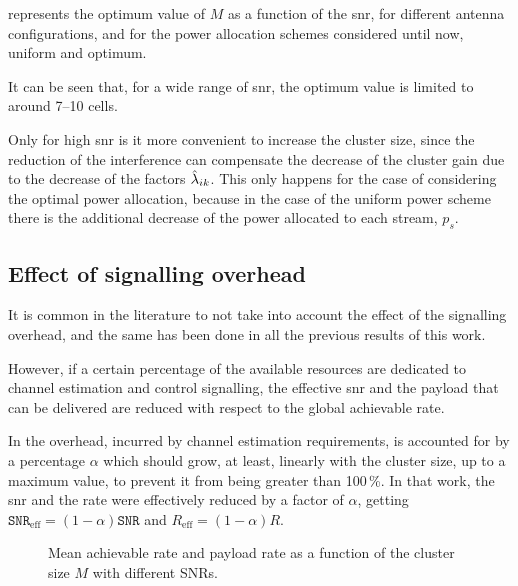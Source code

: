  represents the optimum value of $M$ as a function of the
\gls{snr}, for different antenna configurations, and for the power allocation
schemes considered until now, uniform and optimum.

It can be seen that, for a wide range of \gls{snr}, the optimum value is limited
to around 7--10 cells.

Only for high \gls{snr} is it more convenient to increase the cluster size,
since the reduction of the interference can compensate the decrease of the
cluster gain due to the decrease of the factors $\hat{\lambda}_{ik}$. This only
happens for the case of considering the optimal power allocation, because in the
case of the uniform power scheme there is the additional decrease of the power
allocated to each stream, $p_s$.

\subsection{Effect of signalling overhead}\label{ssec:achiev_signal_overhead}

It is common in the literature to not take into account the effect of the
signalling overhead, and the same has been done in all the previous results of
this work.

However, if a certain percentage of the available resources are dedicated to
channel estimation and control signalling, the effective \gls{snr} and the
payload that can be delivered are reduced with respect to the global achievable
rate.

In \cite{lozano13} the overhead, incurred by channel estimation requirements, is
accounted for by a percentage $\alpha$ which should grow, at least, linearly
with the cluster size, up to a maximum value, to prevent it from being greater
than 100\,\%. In that work, the \gls{snr} and the rate were effectively reduced
by a factor of $\alpha$, getting $\mathtt{SNR}_{\text{eff}}=\left(1-\alpha
\right)\mathtt{SNR}$ and $R_{\text{eff}} = \left(1-\alpha\right)R$.

\begin{figure}[t]
\begin{center}
    \dummybox
\end{center}
\caption{Mean achievable rate and payload rate as a function of the cluster size
$M$ with different SNRs.}
\label{fig:signal_overhead}
\end{figure}


